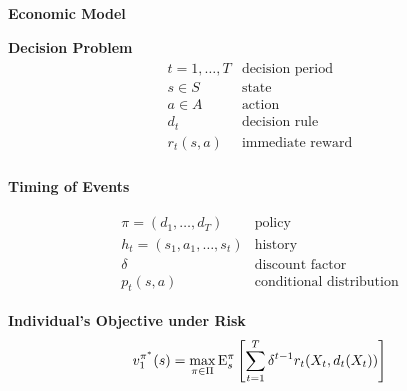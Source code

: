 \begin{frame}\begin{center}
\LARGE\textbf{Economic Model}
\end{center}\end{frame}
\begin{frame}
\textbf{Decision Problem}
\begin{align*}\begin{array}{ll}
t = 1, \hdots, T& \text{decision period} \\
s\in S & \text{state}  \\
a\in A & \text{action} \\
d_t & \text{decision rule} \\
r_t(s, a) & \text{immediate reward}\\
\end{array}\end{align*}
\end{frame}
\begin{frame}
\begin{center}\textbf{Timing of Events}\vspace{0.9cm}
\scalebox{0.9}{\hspace{-0.2cm}}
\end{center}
\end{frame}
\begin{frame}
\begin{align*}\begin{array}{ll}
\pi = (d_1, \hdots, d_T) & \text{policy}\\
h_t = (s_1, a_1, \hdots, s_t) & \text{history} \\
\delta & \text{discount factor} \\
p_t(s, a) & \text{conditional distribution}
\end{array}\end{align*}
\end{frame}
\begin{frame}
\textbf{Individual's Objective under Risk}\vspace{0.3cm}
\begin{align*}
v^{\pi^*}_1(s) = \max_{\pi\in\Pi} \mathrm{E}_{s}^\pi\left[\sum^{T}_{t = 1}  \delta^{t - 1} r_t(X_t, d_t(X_t))\right]
\end{align*}
\end{frame}

